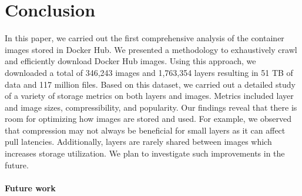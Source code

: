 \section{Conclusion}
\label{sec:conclusion}

In this paper, we carried out the first comprehensive analysis of the container images
stored in Docker Hub.
%
We presented a methodology to exhaustively crawl and efficiently download Docker Hub
images. Using this approach, we downloaded a total of 346,243 images and 1,763,354 layers
resulting in 51 TB of data and
117 million files.
%
Based on this dataset, we carried out a detailed study of a variety of storage
metrics on both layers and images. Metrics included layer and image sizes, compressibility,
and popularity. Our findings reveal that there is room for optimizing how images
are stored and used. For example, we observed that compression may not always be beneficial for small
layers as it can affect pull latencies. Additionally, layers are rarely shared between
images which increases storage utilization. We plan to investigate such improvements
in the future.

\paragraph{Future work}
%

%
%
